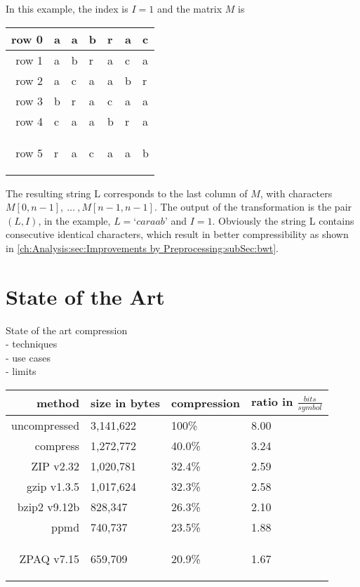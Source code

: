 \par{
In this example, the index is $I = 1$ and the matrix $M$ is

\begin{center}
	\begin{tabular}[p]{r|l|l|l|l|l|l}
		
		row 0 & a & a & b & r & a & c\\
		\hline
		row 1 & a & b & r & a & c & a\\
		\hline
		row 2 & a & c & a & a & b & r\\
		\hline
		row 3 & b & r & a & c & a & a\\
		\hline
		row 4 & c & a & a & b & r & a\\
		\hline
		row 5 & r & a & c & a & a & b

		\label{tab:t10 bwt-example}
	\end{tabular}
\end{center}


The resulting string L corresponds to the last column of $M$, with characters $M[0,n -1],\: \dots \: ,M[n - 1, n - 1]$. The output of the transformation is the pair $(L, I)$, in the example, $L = ‘caraab’$ and $I = 1$. Obviously the string L contains consecutive identical characters, which result in better compressibility as shown in \ref{ch:Analysis:sec:Improvements by Preprocessing:subSec:bwt}.
}

\section{State of the Art}
\label{ch:Principles of compression:sec:SOTA}
State of the art compression\\
- techniques\\
- use cases\\
- limits\\

\par{
	
	\begin{center}
		\begin{tabular}[p]{r|l|l|l}
			
			method &  size in bytes & compression & ratio in $\frac{bits}{symbol}$\\
			\hline
			uncompressed & 3,141,622 & 100\% & 8.00\\
			compress & 1,272,772 & 40.0\% & 3.24\\
			ZIP v2.32 & 1,020,781 & 32.4\% & 2.59\\
			gzip v1.3.5 & 1,017,624 & 32.3\% & 2.58\\
			bzip2 v9.12b & 828,347 & 26.3\% & 2.10 \\
			ppmd & 740,737 & 23.5\% & 1.88\\
			ZPAQ v7.15& 659,709 & 20.9\% & 1.67 
			
			\label{tab:t20 stat of the art}
		\end{tabular}
	\end{center}

}

